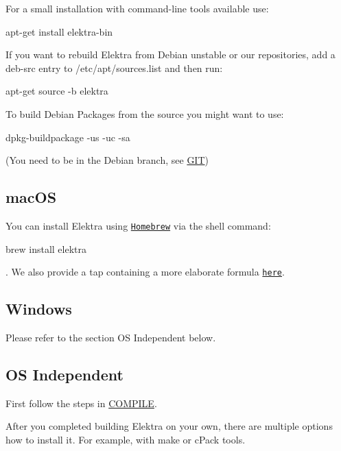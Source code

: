 For a small installation with command-\/line tools available use\+:


\begin{DoxyCode}
apt-get install elektra-bin
\end{DoxyCode}


If you want to rebuild Elektra from Debian unstable or our repositories, add a {\ttfamily deb-\/src} entry to {\ttfamily /etc/apt/sources.list} and then run\+:


\begin{DoxyCode}
apt-get source -b elektra
\end{DoxyCode}


To build Debian Packages from the source you might want to use\+:


\begin{DoxyCode}
dpkg-buildpackage -us -uc -sa
\end{DoxyCode}


(You need to be in the Debian branch, see \hyperlink{doc_GIT_md}{G\+IT})

\subsection*{mac\+OS}

You can install Elektra using \href{http://brew.sh}{\tt Homebrew} via the shell command\+:


\begin{DoxyCode}
brew install elektra
\end{DoxyCode}


. We also provide a tap containing a more elaborate formula \href{http://github.com/ElektraInitiative/homebrew-elektra}{\tt here}.

\subsection*{Windows}

Please refer to the section OS Independent below.

\subsection*{OS Independent}

First follow the steps in \hyperlink{doc_COMPILE_md}{C\+O\+M\+P\+I\+LE}.

After you completed building Elektra on your own, there are multiple options how to install it. For example, with make or c\+Pack tools.

